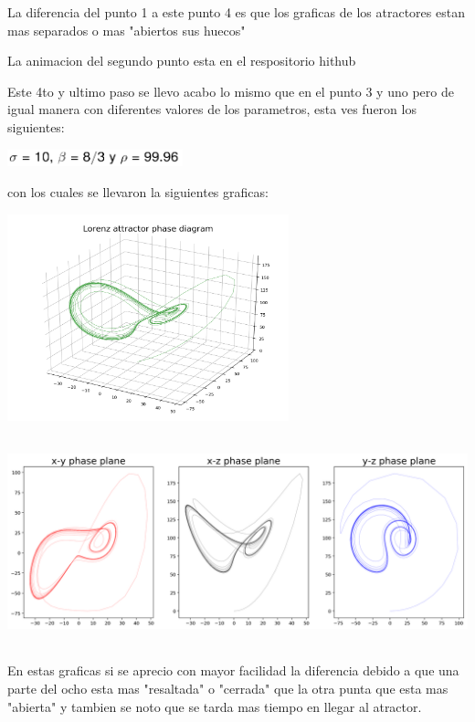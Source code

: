 \documentclass{article}
\begin{document}
La diferencia del punto 1 a este punto 4 es que los graficas de los atractores estan mas separados o mas "abiertos sus huecos"

La animacion del segundo punto esta en el respositorio hithub

\vspace{6.5cm}

Este 4to y ultimo paso se llevo acabo lo mismo que en el punto 3 y uno pero de igual manera con diferentes valores de los parametros, esta ves fueron los siguientes:

\begin{center}
\includegraphics[height=0.5cm]{cod3.png}
\end{center}

con los cuales se llevaron la siguientes graficas:

\begin{center}
\includegraphics[height=6cm]{lorenz-attractor-3d-4.png}
\end{center}

\begin{center}
\includegraphics[height=6cm]{lorenz-attractor-phase-plane-4.png}
\end{center}


En estas graficas si se aprecio con mayor facilidad la diferencia debido a que una parte del ocho esta mas "resaltada" o "cerrada" que la otra punta que esta mas "abierta" y tambien se noto que se tarda mas tiempo en llegar al atractor.
\end{document}
